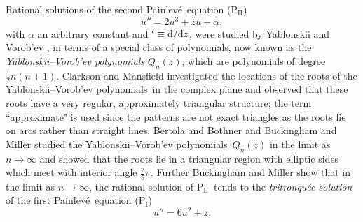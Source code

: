 \documentclass[10pt]{amsart}
\theoremstyle{definition}
\numberwithin{equation}{section}
\numberwithin{figure}{section}
\newcommand{\PI}{$\mathrm{P}_{\mathrm{I}}$}
\renewcommand{\PII}{$\mathrm{P}_{\mathrm{II}}$}
\newcommand{\p}{Painlev\'{e}}
\def\d{{\rm d}}
\newcommand{\deriv}[3][]{\frac{\d^{#1}{#2}}{{\d{#3}}^{#1}}}
\renewcommand{\a}{\alpha}
\newcommand{\VY}{Yablonskii--Vorob'ev polynomials}
\begin{document}
Rational solutions of the second \p\ equation (\PII) %
\begin{equation}\label{eq:P2}
u''=2u^3+zu+\a,
\end{equation}
with $\a$ an arbitrary constant and $'\equiv \d/\d z$,
were studied by Yablonskii \cite{yablonskii1959rational} and Vorob'ev \cite{vorob1965rational},
in terms of a special class of polynomials, now known as the \textit{\VY} $Q_n(z)$, which are polynomials of degree $\tfrac12n(n+1)$. 
Clarkson and Mansfield \cite{refCM03} investigated the locations of the roots of the \VY\ in the complex plane and observed that these roots have a very regular, approximately triangular structure; the term ``approximate" is used since the patterns are not exact triangles as the roots lie on arcs rather than straight lines.
Bertola and Bothner \cite{refBB15} and Buckingham and Miller \cite{refBM14,refBM15} studied the \VY\ $Q_n(z)$ in the limit as $n\to\infty$ and showed that the roots lie in a triangular region with elliptic sides which meet with interior angle $\tfrac25\pi$. 
Further Buckingham and Miller \cite{refBM14,refBM15} show that in the limit as $n\to\infty$, the rational solution of \PII\ tends to the \textit{tritronqu\'ee solution} of the first \p\ equation (\PI) %
\begin{equation}\label{eq:P1}
u''=6u^2+z.
\end{equation}
\end{document}
